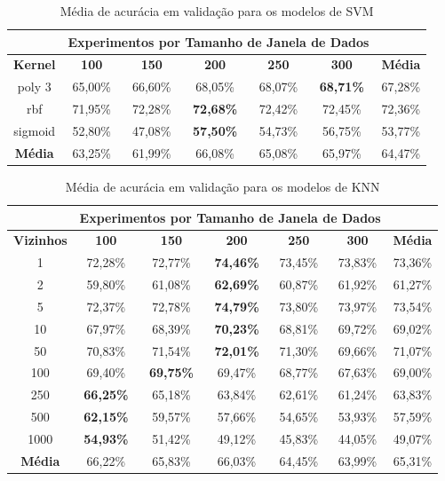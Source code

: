 \begin{table}[H]
\scriptsize
\centering
\caption{Média de acurácia em validação para os modelos de SVM} 
\label{table:svm_results_tipo_superficie_1}
\begin{tabular}{ccccccc}
\cmidrule(lr){2-6}
& \multicolumn{5}{c}{\textbf{Experimentos por Tamanho de Janela de Dados}} & \multicolumn{1}{c}{} \\ \midrule
\textbf{Kernel} & \textbf{100} & \textbf{150} & \textbf{200} & \textbf{250} & \textbf{300} & \textbf{Média} \\ \midrule
poly 3 & 65,00\% & 66,60\% & 68,05\% & 68,07\% & \textbf{68,71\%} & 67,28\% \\ \midrule
rbf & 71,95\% & 72,28\% & \cellcolor[HTML]{34FF34}\textbf{72,68\%} & 72,42\% & 72,45\% & 72,36\% \\ \midrule
sigmoid & 52,80\% & 47,08\% & \textbf{57,50\%} & 54,73\% & 56,75\% & 53,77\% \\ \midrule
\textbf{Média} & 63,25\% & 61,99\% & 66,08\% & 65,08\% & 65,97\% & 64,47\% \\ \bottomrule
\end{tabular}
\end{table}

\begin{table}[H]
\scriptsize
\centering
\caption{Média de acurácia em validação para os modelos de KNN} 
\label{table:knn_results_tipo_superficie_1}
\begin{tabular}{ccccccc}
\cmidrule(lr){2-6}
& \multicolumn{5}{c}{\textbf{Experimentos por Tamanho de Janela de Dados}} & \multicolumn{1}{c}{} \\ \midrule
\textbf{Vizinhos} & \textbf{100} & \textbf{150} & \textbf{200} & \textbf{250} & \textbf{300} & \textbf{Média} \\ \midrule
1 & 72,28\% & 72,77\% & \textbf{74,46\%} & 73,45\% & 73,83\% & 73,36\% \\ \midrule
2 & 59,80\% & 61,08\% & \textbf{62,69\%} & 60,87\% & 61,92\% & 61,27\% \\ \midrule
5 & 72,37\% & 72,78\% & \cellcolor[HTML]{34FF34}\textbf{74,79\%} & 73,80\% & 73,97\% & 73,54\% \\ \midrule
10 & 67,97\% & 68,39\% & \textbf{70,23\%} & 68,81\% & 69,72\% & 69,02\% \\ \midrule
50 & 70,83\% & 71,54\% & \textbf{72,01\%} & 71,30\% & 69,66\% & 71,07\% \\ \midrule
100 & 69,40\% & \textbf{69,75\%} & 69,47\% & 68,77\% & 67,63\% & 69,00\% \\ \midrule
250 & \textbf{66,25\%} & 65,18\% & 63,84\% & 62,61\% & 61,24\% & 63,83\%\\ \midrule
500 & \textbf{62,15\%} & 59,57\% & 57,66\% & 54,65\% & 53,93\% & 57,59\% \\ \midrule
1000 & \textbf{54,93\%} & 51,42\% & 49,12\% & 45,83\% & 44,05\% & 49,07\% \\ \midrule
\textbf{Média} & 66,22\% & 65,83\% & 66,03\% & 64,45\% & 63,99\% & 65,31\% \\ \bottomrule
\end{tabular}
\end{table}

